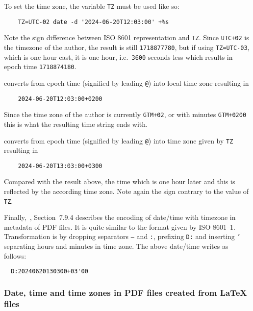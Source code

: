 \documentclass[a4paper, english]{article}%
\begin{document}
\begin{description}[style=nextline]
  To set the time zone, the variable \texttt{TZ} must be used like so: 
  \begin{verbatim}
    TZ=UTC-02 date -d '2024-06-20T12:03:00' +%s
  \end{verbatim}
  Note the sign difference between ISO 8601 representation and \texttt{TZ}. 
  Since \texttt{UTC+02} is the timezone of the author, the result is still \texttt{1718877780}, 
  but if using \texttt{TZ=UTC-03}, which is one hour east, 
  it is one hour, i.e.~\@ \texttt{3600} seconds less which results in epoch time \texttt{1718874180}. 
  \item[\texttt{date -d '@1718877780' +\%FT\%T\%z}] 
  converts from epoch time (signified by leading \texttt{@}) into local time zone resulting in 
  \begin{verbatim}
    2024-06-20T12:03:00+0200
  \end{verbatim}
  Since the time zone of the author is currently \texttt{GTM+02}, or with minutes \texttt{GTM+0200}
  this is what the resulting time string ends with. 
  \item[\texttt{TZ=UTC-03 date -d '@1718877780' +\%FT\%T\%z}] 
  converts from epoch time (signified by leading \texttt{@}) into time zone given by \texttt{TZ} resulting in 
  \begin{verbatim}
    2024-06-20T13:03:00+0300
  \end{verbatim}
  Compared with the result above, the time which is one hour later 
  and this is reflected by the according time zone. 
  Note again the sign contrary to the value of \texttt{TZ}. 
\end{description}


Finally,~\cite{Pdf20}, Section~7.9.4 describes the encoding 
of date/time with timezone in metadata of PDF files. 
It is quite similar to the format given by ISO 8601--1. 
Transformation is by dropping separators \texttt{--} and \texttt{:}, 
prefixing \texttt{D:} and inserting \texttt{'} separating hours and minutes in time zone. 
The above date/time writes as follows: 
%
\begin{verbatim}
  D:20240620130300+03'00
\end{verbatim}

\subsubsection{Date, time and time zones in PDF files created from \LaTeX{} files}%
\label{subsubsec:dateTimeZoneTexPdf}
\end{document}
